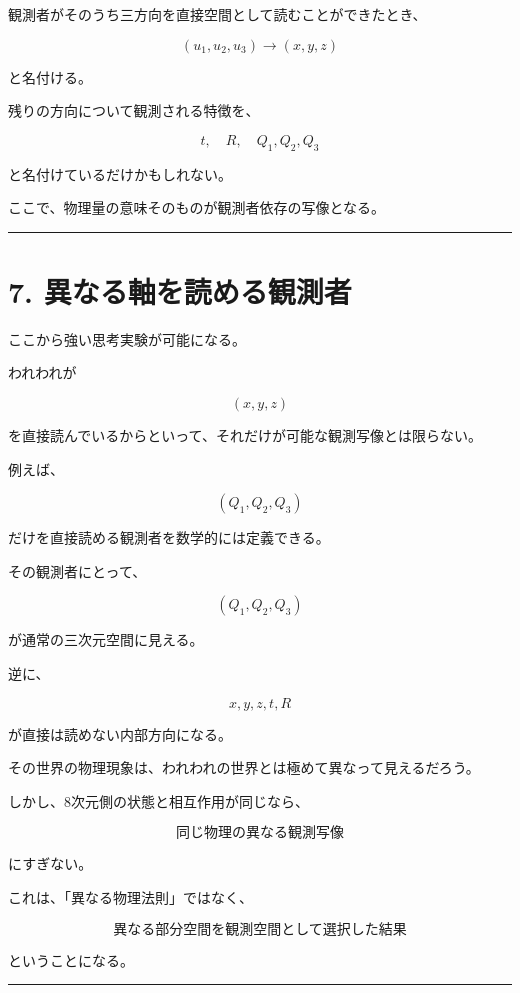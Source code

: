 \documentclass[
  a4paper,
]{ltjsarticle}
\begin{document}
観測者がそのうち三方向を直接空間として読むことができたとき、

\[
(u_1,u_2,u_3)\rightarrow(x,y,z)
\]

と名付ける。

残りの方向について観測される特徴を、

\[
t,\quad R,\quad Q_1,Q_2,Q_3
\]

と名付けているだけかもしれない。

ここで、物理量の意味そのものが観測者依存の写像となる。

\begin{center}\rule{0.5\linewidth}{0.5pt}\end{center}

\section{7.
異なる軸を読める観測者}\label{ux7570ux306aux308bux8ef8ux3092ux8aadux3081ux308bux89b3ux6e2cux8005}

ここから強い思考実験が可能になる。

われわれが

\[
(x,y,z)
\]

を直接読んでいるからといって、それだけが可能な観測写像とは限らない。

例えば、

\[
(Q_1,Q_2,Q_3)
\]

だけを直接読める観測者を数学的には定義できる。

その観測者にとって、

\[
(Q_1,Q_2,Q_3)
\]

が通常の三次元空間に見える。

逆に、

\[
x,y,z,t,R
\]

が直接は読めない内部方向になる。

その世界の物理現象は、われわれの世界とは極めて異なって見えるだろう。

しかし、8次元側の状態と相互作用が同じなら、

\[
\boxed{
\text{同じ物理の異なる観測写像}
}
\]

にすぎない。

これは、「異なる物理法則」ではなく、

\[
\boxed{
\text{異なる部分空間を観測空間として選択した結果}
}
\]

ということになる。

\begin{center}\rule{0.5\linewidth}{0.5pt}\end{center}
\end{document}
